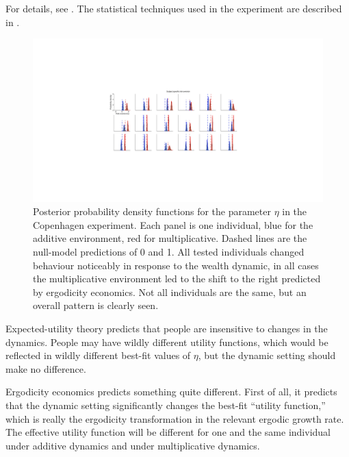 For details, see \cite{MederETAL2019}. The statistical techniques used in the experiment
are described in \cite{LeeWagenmakers2013}.


\begin{figure}
    \includegraphics[width=\textwidth]{./chapter_real/singleSubjects.pdf}
    \caption{Posterior probability density functions for the parameter $\eta$ in the Copenhagen 
    experiment. Each panel is one individual, blue for the additive environment, red for 
    multiplicative. Dashed lines are the null-model predictions of 0 and 1. All tested individuals 
    changed behaviour noticeably in response to the wealth dynamic, in all cases the 
    multiplicative environment led to the shift to the right predicted by ergodicity economics. 
    Not all individuals are the same, but an overall pattern is clearly seen.}
    \label{fig:HulmeETAL}
\end{figure}

Expected-utility theory predicts that people are insensitive to changes in the dynamics. 
People may have wildly different utility functions, which would be reflected in wildly 
different best-fit values of $\eta$, but the dynamic setting should make no difference. 

Ergodicity economics predicts something quite different. First of all, it predicts that the 
dynamic setting significantly changes the best-fit ``utility function,'' which is really the 
ergodicity transformation in the relevant ergodic growth rate. The effective utility function will 
be different for one and the same individual under additive dynamics and under 
multiplicative dynamics. 

